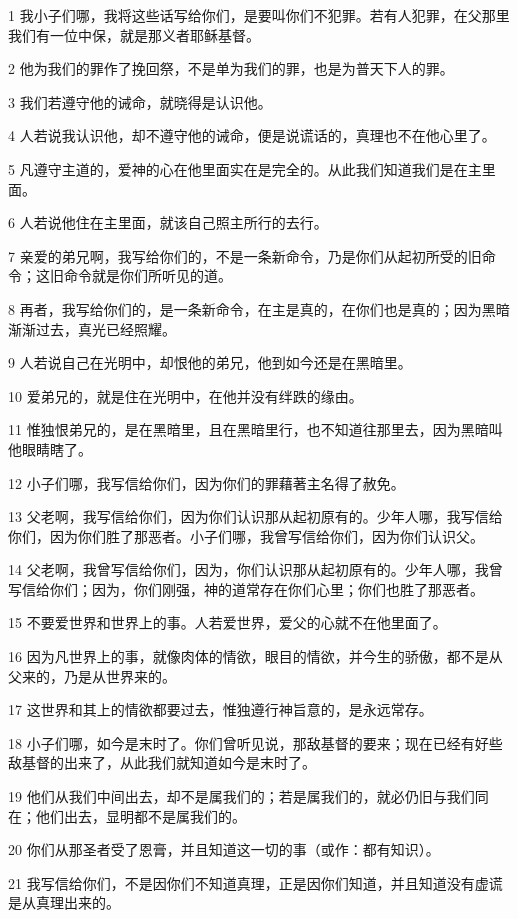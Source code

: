 \par 1 我小子们哪，我将这些话写给你们，是要叫你们不犯罪。若有人犯罪，在父那里我们有一位中保，就是那义者耶稣基督。
\par 2 他为我们的罪作了挽回祭，不是单为我们的罪，也是为普天下人的罪。
\par 3 我们若遵守他的诫命，就晓得是认识他。
\par 4 人若说我认识他，却不遵守他的诫命，便是说谎话的，真理也不在他心里了。
\par 5 凡遵守主道的，爱神的心在他里面实在是完全的。从此我们知道我们是在主里面。
\par 6 人若说他住在主里面，就该自己照主所行的去行。
\par 7 亲爱的弟兄啊，我写给你们的，不是一条新命令，乃是你们从起初所受的旧命令；这旧命令就是你们所听见的道。
\par 8 再者，我写给你们的，是一条新命令，在主是真的，在你们也是真的；因为黑暗渐渐过去，真光已经照耀。
\par 9 人若说自己在光明中，却恨他的弟兄，他到如今还是在黑暗里。
\par 10 爱弟兄的，就是住在光明中，在他并没有绊跌的缘由。
\par 11 惟独恨弟兄的，是在黑暗里，且在黑暗里行，也不知道往那里去，因为黑暗叫他眼睛瞎了。
\par 12 小子们哪，我写信给你们，因为你们的罪藉著主名得了赦免。
\par 13 父老啊，我写信给你们，因为你们认识那从起初原有的。少年人哪，我写信给你们，因为你们胜了那恶者。小子们哪，我曾写信给你们，因为你们认识父。
\par 14 父老啊，我曾写信给你们，因为，你们认识那从起初原有的。少年人哪，我曾写信给你们；因为，你们刚强，神的道常存在你们心里；你们也胜了那恶者。
\par 15 不要爱世界和世界上的事。人若爱世界，爱父的心就不在他里面了。
\par 16 因为凡世界上的事，就像肉体的情欲，眼目的情欲，并今生的骄傲，都不是从父来的，乃是从世界来的。
\par 17 这世界和其上的情欲都要过去，惟独遵行神旨意的，是永远常存。
\par 18 小子们哪，如今是末时了。你们曾听见说，那敌基督的要来；现在已经有好些敌基督的出来了，从此我们就知道如今是末时了。
\par 19 他们从我们中间出去，却不是属我们的；若是属我们的，就必仍旧与我们同在；他们出去，显明都不是属我们的。
\par 20 你们从那圣者受了恩膏，并且知道这一切的事（或作：都有知识）。
\par 21 我写信给你们，不是因你们不知道真理，正是因你们知道，并且知道没有虚谎是从真理出来的。
